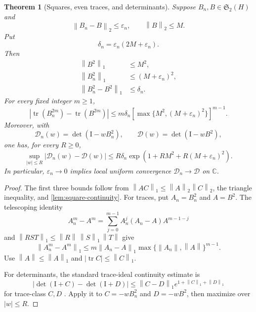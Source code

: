 \documentclass[11pt]{article}
\newtheorem{theorem}{Theorem}[section]
\theoremstyle{definition}
\theoremstyle{remark}
\newcommand{\C}{\mathbb C}
\newcommand{\Id}{\mathrm I}
\newcommand{\cD}{\mathcal D}
\newcommand{\norm}[1]{\left\lVert #1\right\rVert}
\newcommand{\tr}{\operatorname{tr}}
\newcommand{\detF}{\operatorname{det}}
\begin{document}
\begin{theorem}[Squares, even traces, and determinants]
\label{thm:abstract}
Suppose $B_n,B\in\mathfrak S_2(H)$ and
\begin{equation}
 \norm{B_n-B}_2\le\varepsilon_n,
 \qquad
 \norm B_2\le M.
 \label{eq:abstract-hs-input}
\end{equation}
Put
\begin{equation}
 \delta_n=\varepsilon_n(2M+\varepsilon_n).
 \label{eq:delta-definition}
\end{equation}
Then
\begin{align}
 \norm{B^2}_1&\le M^2,
 \label{eq:continuum-square-trace-upper}\\
 \norm{B_n^2}_1&\le(M+\varepsilon_n)^2,
 \label{eq:discrete-square-trace-upper}\\
 \norm{B_n^2-B^2}_1&\le\delta_n.
 \label{eq:trace-norm-square-error}
\end{align}
For every fixed integer $m\ge1$,
\begin{equation}
 \left|\tr(B_n^{2m})-\tr(B^{2m})\right|
 \le m\delta_n
 \left[\max\{M^2,(M+\varepsilon_n)^2\}\right]^{m-1}.
 \label{eq:even-trace-error}
\end{equation}
Moreover, with
\begin{equation}
 \cD_n(w)=\detF(\Id-wB_n^2),
 \qquad
 \cD(w)=\detF(\Id-wB^2),
 \label{eq:determinants-defined}
\end{equation}
one has, for every $R\ge0$,
\begin{equation}
 \sup_{|w|\le R}|\cD_n(w)-\cD(w)|
 \le R\delta_n
 \exp\!\left(1+RM^2+R(M+\varepsilon_n)^2\right).
 \label{eq:determinant-disk-bound}
\end{equation}
In particular, $\varepsilon_n\to0$ implies local uniform convergence
$\cD_n\to\cD$ on $\C$.
\end{theorem}

\begin{proof}
The first three bounds follow from
$\norm{AC}_1\le\norm A_2\norm C_2$, the triangle inequality, and
\cref{lem:square-continuity}.  For traces, put $A_n=B_n^2$ and $A=B^2$.
The telescoping identity
\[
 A_n^m-A^m
 =\sum_{j=0}^{m-1}A_n^j(A_n-A)A^{m-1-j}
\]
and $\norm{RST}_1\le\norm R\,\norm S_1\,\norm T$ give
\[
 \norm{A_n^m-A^m}_1
 \le m\norm{A_n-A}_1
 \max\{\norm{A_n},\norm A\}^{m-1}.
\]
Use $\norm A\le\norm A_1$ and
$|\tr C|\le\norm C_1$.

For determinants, the standard trace-ideal continuity estimate is
\begin{equation}
 |\detF(\Id+C)-\detF(\Id+D)|
 \le\norm{C-D}_1
 e^{1+\norm C_1+\norm D_1}
 \label{eq:standard-determinant-bound}
\end{equation}
for trace-class $C,D$ \citep{Simon2005}.  Apply it to
$C=-wB_n^2$ and $D=-wB^2$, then maximize over $|w|\le R$.
\end{proof}
\end{document}
